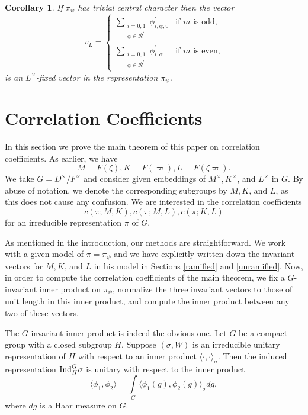 \documentclass[12pt]{amsart}
\newtheorem{corollary}[theorem]{Corollary}%
\theoremstyle{definition}
\theoremstyle{remark}
\begin{document}
\begin{corollary}\label{cor5}
If $\pi_\psi$ has trivial central character then the vector 
\[v_L = \begin{cases}
\sum\limits_{\substack{i=0,1 \\  \underline{\alpha} \in \mathcal{R}^\prime}}   \phi_{i,\underline{\alpha},0}^\prime  &\text{if $m$ is odd,} \\
\sum\limits_{\substack{i=0,1 \\  \underline{\alpha} \in \mathcal{R}^\prime  }} \phi_{i,\underline{\alpha}}^\prime  &\text{if $m$ is even,} 
\end{cases}\]
is an $L^\times$-fixed vector in the representation $\pi_\psi$.
\end{corollary}

\section{Correlation Coefficients}\label{correlation}

In this section we prove the main theorem of this paper on correlation coefficients. As earlier, we have
\[M = F(\zeta), K = F(\varpi), L = F(\zeta\varpi).\] We take $G = D^\times/F^\times$ and consider given embeddings of $M^\times, K^\times$, and $L^\times$ in $G$. By abuse of notation, we denote the corresponding subgroups by $M, K$, and $L$, as this does not cause any confusion. We are interested in the correlation coefficients 
\[c(\pi;M,K), c(\pi;M,L), c(\pi;K,L)\]
for an irreducible representation $\pi$ of $G$.  

As mentioned in the introduction, our methods are straightforward. We work with a given model of $\pi=\pi_\psi$ and we have explicitly written down the invariant vectors for $M,K$, and $L$ in his model in Sections \ref{ramified} and \ref{unramified}. Now, in order to compute the correlation coefficients of the main theorem, we fix a $G$-invariant inner product on $\pi_\psi$, normalize the three invariant vectors to those of unit length in this inner product, and compute the inner product between any two of these vectors.   

The $G$-invariant inner product is indeed the obvious one. Let $G$ be a compact group with a closed subgroup $H$. Suppose $(\sigma, W)$ is an irreducible unitary representation of $H$ with respect to an inner product $\langle \cdot, \cdot \rangle_\sigma$. Then the induced representation ${\rm Ind}_H^G \sigma$ is unitary with respect to the inner product 
\[\langle \phi_1, \phi_2 \rangle = \int\limits_G \langle \phi_1(g) , \phi_2(g) \rangle_\sigma dg,\] 
where $dg$ is a Haar measure on $G$.
\end{document}
